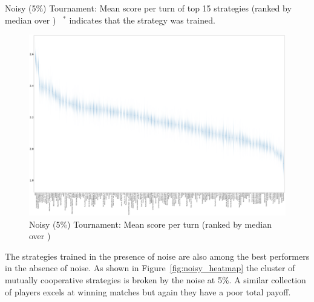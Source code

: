 \documentclass{article}
\begin{document}
\begin{table}[!hbtp]
    \centering
        
        \caption{Noisy (5\%) Tournament: Mean score per turn of top 15 strategies
        (ranked by median over
        \protecttournaments)
        ~$^{*}$ indicates that the strategy was trained.}
        \label{tbl:noisy_score}
\end{table}


\begin{landscape}
    \begin{figure}[!hbtp]
        \centering
        \includegraphics[width=\paperwidth]{./assets/noisy_scores_boxplots.pdf}
        \caption{Noisy (5\%) Tournament: Mean score per turn (ranked by median
        over
        \protecttournaments)}
        \label{fig:noisy_score}
    \end{figure}
\end{landscape}


The strategies trained in the presence of noise are also among the best
performers in the absence of noise. As shown in Figure~\ref{fig:noisy_heatmap}
the cluster of mutually cooperative strategies is broken by the noise at 5\%. A
similar collection of players excels at winning matches but again they have a
poor total payoff.
\end{document}

